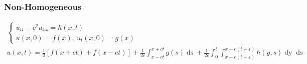 \documentclass{article}
\begin{document}
\subsubsection*{Non-Homogeneous}
\begin{gather*}
\begin{cases}
u_{tt} - c^{2}u_{xx} = h(x,t)\\
u(x,0) = f(x),\ u_{t}(x,0) = g(x)
\end{cases}\\
u(x,t) = \frac{1}{2}\left[f(x+ct) + f(x-ct)\right] + \frac{1}{2c}\int_{x-ct}^{x+ct}g(s)\mathop{ds} + \frac{1}{2c}\int_{0}^{t}\int_{x-c(t-s)}^{x+c(t-s)}h(y,s)\mathop{dy}\mathop{ds}
\end{gather*}
\end{document}
